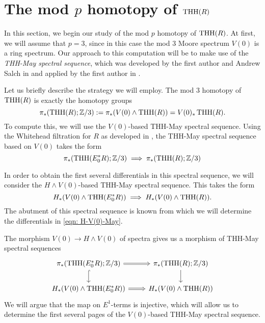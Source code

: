 
\section{The mod $p$ homotopy of $\operatorname{THH}(R)$}

In this section, we begin our study of the mod $p$ homotopy of $\operatorname{THH}(R)$. At first, we will assume that $p=3$, since in this case the mod 3 Moore spectrum $V(0)$ is a ring spectrum. Our approach to this computation will be to make use of the \emph{THH-May spectral sequence}, which was developed by the first author and Andrew Salch in \cite{THH-May} and applied by the first author in \cite{THHK1-local}. 


Let us briefly describe the strategy we will employ. The mod 3 homotopy of $\operatorname{THH}(R)$ is exactly the homotopy groups
\[
\pi_*(\operatorname{THH}(R);\mathbb{Z}/3):= \pi_*(V(0)\wedge \operatorname{THH}(R)) = V(0)_*\operatorname{THH}(R).
\]
To compute this, we will use the $V(0)$-based THH-May spectral sequence. Using the Whitehead filtration for $R$ as developed in \cite{THH-May}, the THH-May spectral sequence based on $V(0)$ takes the form 
\begin{equation}\label{eqn:V(0)-May}
	\pi_*(\operatorname{THH}(E^*_0R);\mathbb{Z}/3)\implies \pi_*(\operatorname{THH}(R);\mathbb{Z}/3)
\end{equation}

In order to obtain the first several differentials in this spectral sequence, we will consider the $H\wedge V(0)$-based THH-May spectral sequence. This takes the form 
\begin{equation}\label{eqn: H-V(0)-May}
	H_*(V(0)\wedge \operatorname{THH}(E^*_0R))\implies H_*(V(0)\wedge \operatorname{THH}(R)).
\end{equation}
The abutment of this spectral sequence is known from which we will determine the differentials in \eqref{eqn: H-V(0)-May}.

The morphism $V(0)\to H\wedge V(0)$ of spectra gives us a morphism of THH-May spectral sequences
\begin{equation}\label{eqn:morphism of THH-MaySS}
\begin{tikzcd}
	\pi_*(\THH(E^*_0R);\Z/3)\arrow[d, hook]\arrow[r,Rightarrow]& \pi_*(\THH(R);\Z/3)\arrow[d]\\
	 H_*(V(0)\wedge \THH(E^*_0R))\arrow[r, Rightarrow] & H_*(V(0)\wedge \THH(R))
\end{tikzcd}
\end{equation}
We will argue that the map on $E^1$-terms is injective, which will allow us to determine the first several pages of the $V(0)$-based THH-May spectral sequence. 

